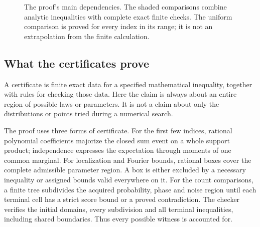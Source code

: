 \begin{figure}[ht]
\centering
{}
\caption{The proof's main dependencies. The shaded comparisons combine
analytic inequalities with complete exact finite checks. The uniform
comparison is proved for every index in its range; it is not an
extrapolation from the finite calculation.}
\end{figure}

\FloatBarrier
\subsection{What the certificates prove}
A certificate is finite exact data for a specified mathematical inequality,
together with rules for checking those data. Here the claim is always about
an entire region of possible laws or parameters. It is not a claim about
only the distributions or points tried during a numerical search.

The proof uses three forms of certificate. For the first few indices,
rational polynomial coefficients majorize the closed sum event on a whole
support product; independence expresses the expectation through moments of
one common marginal. For localization and Fourier bounds, rational boxes
cover the complete admissible parameter region. A box is either excluded
by a necessary inequality or assigned bounds valid everywhere on it.
For the count comparisons, a finite tree subdivides the acquired probability,
phase and noise region until each terminal cell has a strict score bound
or a proved contradiction. The checker verifies the initial domains,
every subdivision and all terminal inequalities, including shared
boundaries. Thus every possible witness is accounted for.

